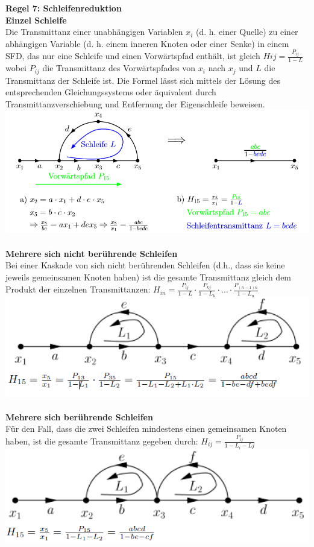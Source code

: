 \noindent\textbf{Regel 7: Schleifenreduktion}\\
\textbf{Einzel Schleife}\\
Die Transmittanz einer unabhängigen Variablen $x_i$ (d. h. einer
Quelle) zu einer abhängigen Variable (d. h. einem inneren
Knoten oder einer Senke) in einem SFD, das nur eine Schleife
und einen Vorwärtspfad enthält, ist gleich $Hij = \frac{P_{ij}}{1 - L}$ wobei
$P_{ij}$ die Transmittanz des Vorwärtspfades von $x_i$ nach $x_j$ und
$L$ die Transmittanz der Schleife ist. Die Formel lässt sich mittels
der Lösung des entsprechenden Gleichungssystems oder äquivalent 
durch Transmittanzverschiebung und Entfernung
der Eigenschleife beweisen.\\
\includegraphics[width=\columnwidth]{Images/sfd_r7}~\\

\textbf{Mehrere sich nicht berührende Schleifen}\\
Bei einer Kaskade von sich nicht berührenden Schleifen (d.h.,
dass sie keine jeweils gemeinsamen Knoten haben) ist
die gesamte Transmittanz gleich dem Produkt der einzelnen
Transmittanzen: $H_{in} = \frac{P_{ij}}{1-L} \cdot \frac{P_{kj}}{1-L_k}\cdot \dots \cdot \frac{P_{(n-1)n}}{1-L_n}$\\
\includegraphics[width=\columnwidth]{Images/sfd_r7b}~\\

\textbf{Mehrere sich berührende Schleifen}\\
Für den Fall, dass die zwei Schleifen mindestens einen gemeinsamen
Knoten haben, ist die gesamte Transmittanz gegeben
durch: $H_{ij} = \frac{P_{ij}}{1 - L_i - Lj}$\\
\includegraphics[width=\columnwidth]{Images/sfd_r7c}~\\



